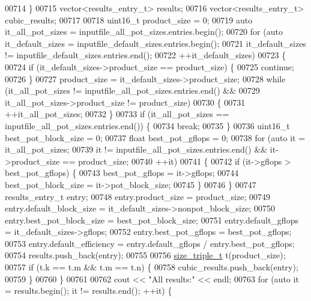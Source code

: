 \begin{DoxyCode}
{{{{{{00714     \}
00715     vector<results\_entry\_t> results;
00716     vector<results\_entry\_t> cubic\_results;
00717     
00718     uint16\_t product\_size = 0;
00719     \textcolor{keyword}{auto} it\_all\_pot\_sizes = inputfile\_all\_pot\_sizes.entries.begin();
00720     \textcolor{keywordflow}{for} (\textcolor{keyword}{auto} it\_default\_sizes = inputfile\_default\_sizes.entries.begin();
00721          it\_default\_sizes != inputfile\_default\_sizes.entries.end();
00722          ++it\_default\_sizes)
00723     \{
00724       \textcolor{keywordflow}{if} (it\_default\_sizes->product\_size == product\_size) \{
00725         \textcolor{keywordflow}{continue};
00726       \}
00727       product\_size = it\_default\_sizes->product\_size;
00728       \textcolor{keywordflow}{while} (it\_all\_pot\_sizes != inputfile\_all\_pot\_sizes.entries.end() &&
00729              it\_all\_pot\_sizes->product\_size != product\_size)
00730       \{
00731         ++it\_all\_pot\_sizes;
00732       \}
00733       \textcolor{keywordflow}{if} (it\_all\_pot\_sizes == inputfile\_all\_pot\_sizes.entries.end()) \{
00734         \textcolor{keywordflow}{break};
00735       \}
00736       uint16\_t best\_pot\_block\_size = 0;
00737       \textcolor{keywordtype}{float} best\_pot\_gflops = 0;
00738       \textcolor{keywordflow}{for} (\textcolor{keyword}{auto} it = it\_all\_pot\_sizes;
00739            it != inputfile\_all\_pot\_sizes.entries.end() && it->product\_size == product\_size;
00740            ++it)
00741       \{
00742         \textcolor{keywordflow}{if} (it->gflops > best\_pot\_gflops) \{
00743           best\_pot\_gflops = it->gflops;
00744           best\_pot\_block\_size = it->pot\_block\_size;
00745         \}
00746       \}
00747       results\_entry\_t entry;
00748       entry.product\_size = product\_size;
00749       entry.default\_block\_size = it\_default\_sizes->nonpot\_block\_size;
00750       entry.best\_pot\_block\_size = best\_pot\_block\_size;
00751       entry.default\_gflops = it\_default\_sizes->gflops;
00752       entry.best\_pot\_gflops = best\_pot\_gflops;
00753       entry.default\_efficiency = entry.default\_gflops / entry.best\_pot\_gflops;
00754       results.push\_back(entry);
00755 
00756       \hyperlink{structsize__triple__t}{size\_triple\_t} t(product\_size);
00757       \textcolor{keywordflow}{if} (t.k == t.m && t.m == t.n) \{
00758         cubic\_results.push\_back(entry);
00759       \}
00760     \}
00761 
00762     cout << \textcolor{stringliteral}{"All results:"} << endl;
00763     \textcolor{keywordflow}{for} (\textcolor{keyword}{auto} it = results.begin(); it != results.end(); ++it) \{
}}}}}}
\end{DoxyCode}
